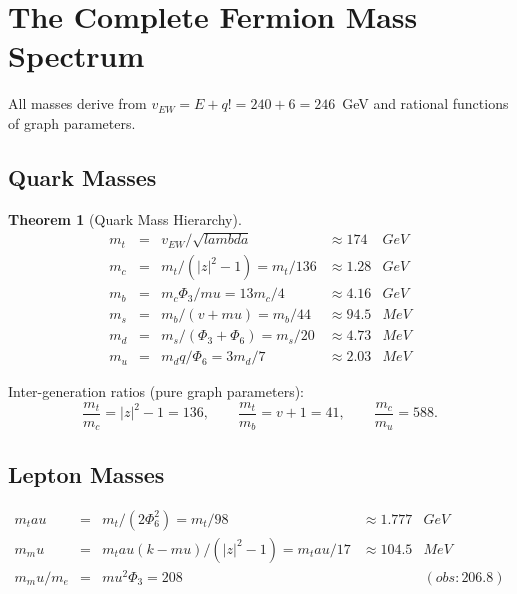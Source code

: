 \documentclass[12pt,a4paper]{article}
\def\mathrm#1{#1}%
\def\text#1{#1}%
\def\lambda{lambda}%
\def\mu{mu}%
\def\Phi#1{Phi#1}%
\def\tau{tau}%
\def\cdot{ }%
\newtheorem{theorem}{Theorem}[section]
\theoremstyle{definition}
\newcommand{\Phithree}{\Phi_3}
\newcommand{\Phisix}{\Phi_6}
\newcommand{\vEW}{v_{\mathrm{EW}}}
\begin{document}
\section{The Complete Fermion Mass Spectrum}
\label{sec:masses}

All masses derive from $\vEW = E+q! = 240+6 = 246$~GeV
and rational functions of graph parameters.

\subsection{Quark Masses}

\begin{theorem}[Quark Mass Hierarchy]
\label{thm:quarks}
\begin{equation}
\renewcommand{\arraystretch}{1.6}
\begin{array}{rclrl}
m_t &=& \vEW/\sqrt{\lambda} &\approx 174 &\text{GeV} \\
m_c &=& m_t/(|z|^2-1) = m_t/136 &\approx 1.28 &\text{GeV} \\
m_b &=& m_c\cdot\Phithree/\mu = 13m_c/4 &\approx 4.16 &\text{GeV} \\
m_s &=& m_b/(v+\mu) = m_b/44 &\approx 94.5 &\text{MeV} \\
m_d &=& m_s/(\Phithree+\Phisix) = m_s/20 &\approx 4.73 &\text{MeV} \\
m_u &=& m_d\cdot q/\Phisix = 3m_d/7 &\approx 2.03 &\text{MeV}
\end{array}
\end{equation}
\end{theorem}

Inter-generation ratios (pure graph parameters):
\begin{equation}
\frac{m_t}{m_c} = |z|^2-1 = 136,\qquad
\frac{m_t}{m_b} = v+1 = 41,\qquad
\frac{m_c}{m_u} = 588.
\end{equation}


\subsection{Lepton Masses}

\begin{equation}
\renewcommand{\arraystretch}{1.5}
\begin{array}{rclrl}
m_\tau &=& m_t/(2\Phisix^2) = m_t/98 &\approx 1.777 &\text{GeV} \\
m_\mu &=& m_\tau\cdot(k-\mu)/(|z|^2-1)=m_\tau/17 &\approx 104.5 &\text{MeV} \\
m_\mu/m_e &=& \mu^2\Phithree = 208 &&(\text{obs: } 206.8)
\end{array}
\end{equation}
\end{document}
